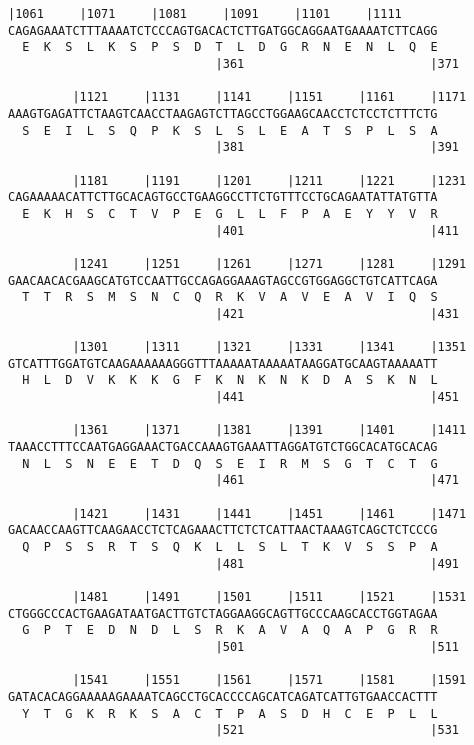 \documentclass{article}
\begin{document}
\newpage
\begin{Verbatim}[fontfamily=courier]
         |1061     |1071     |1081     |1091     |1101     |1111
CAGAGAAATCTTTAAAATCTCCCAGTGACACTCTTGATGGCAGGAATGAAAATCTTCAGG
  E  K  S  L  K  S  P  S  D  T  L  D  G  R  N  E  N  L  Q  E
                             |361                          |371

         |1121     |1131     |1141     |1151     |1161     |1171
AAAGTGAGATTCTAAGTCAACCTAAGAGTCTTAGCCTGGAAGCAACCTCTCCTCTTTCTG
  S  E  I  L  S  Q  P  K  S  L  S  L  E  A  T  S  P  L  S  A
                             |381                          |391

         |1181     |1191     |1201     |1211     |1221     |1231
CAGAAAAACATTCTTGCACAGTGCCTGAAGGCCTTCTGTTTCCTGCAGAATATTATGTTA
  E  K  H  S  C  T  V  P  E  G  L  L  F  P  A  E  Y  Y  V  R
                             |401                          |411

         |1241     |1251     |1261     |1271     |1281     |1291
GAACAACACGAAGCATGTCCAATTGCCAGAGGAAAGTAGCCGTGGAGGCTGTCATTCAGA
  T  T  R  S  M  S  N  C  Q  R  K  V  A  V  E  A  V  I  Q  S
                             |421                          |431

         |1301     |1311     |1321     |1331     |1341     |1351
GTCATTTGGATGTCAAGAAAAAAGGGTTTAAAAATAAAAATAAGGATGCAAGTAAAAATT
  H  L  D  V  K  K  K  G  F  K  N  K  N  K  D  A  S  K  N  L
                             |441                          |451

         |1361     |1371     |1381     |1391     |1401     |1411
TAAACCTTTCCAATGAGGAAACTGACCAAAGTGAAATTAGGATGTCTGGCACATGCACAG
  N  L  S  N  E  E  T  D  Q  S  E  I  R  M  S  G  T  C  T  G
                             |461                          |471

         |1421     |1431     |1441     |1451     |1461     |1471
GACAACCAAGTTCAAGAACCTCTCAGAAACTTCTCTCATTAACTAAAGTCAGCTCTCCCG
  Q  P  S  S  R  T  S  Q  K  L  L  S  L  T  K  V  S  S  P  A
                             |481                          |491

         |1481     |1491     |1501     |1511     |1521     |1531
CTGGGCCCACTGAAGATAATGACTTGTCTAGGAAGGCAGTTGCCCAAGCACCTGGTAGAA
  G  P  T  E  D  N  D  L  S  R  K  A  V  A  Q  A  P  G  R  R
                             |501                          |511

         |1541     |1551     |1561     |1571     |1581     |1591
GATACACAGGAAAAAGAAAATCAGCCTGCACCCCAGCATCAGATCATTGTGAACCACTTT
  Y  T  G  K  R  K  S  A  C  T  P  A  S  D  H  C  E  P  L  L
                             |521                          |531

\end{Verbatim}
\end{document}

